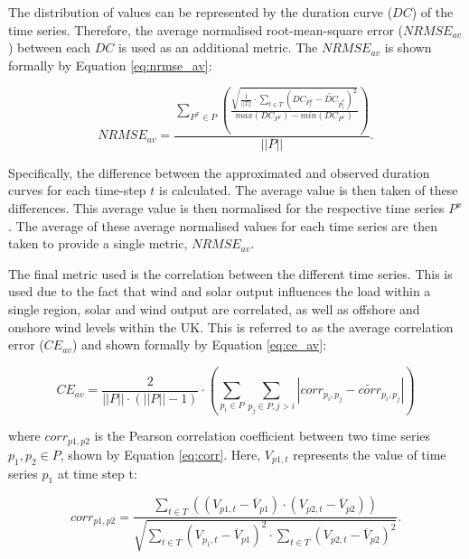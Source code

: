 The distribution of values can be represented by the duration curve ($DC$) of the time series. Therefore, the average normalised root-mean-square error ($NRMSE_{av}$) between each $DC$ is used as an additional metric. The $NRMSE_{av}$ is shown formally by Equation \ref{eq:nrmse_av}:

\begin{equation}
\label{eq:nrmse_av}
NRMSE_{av}=\frac
{\sum\limits_{P^x{\in} P}\left(\frac
	{\sqrt{
			\frac{1}{\left|\left|T\right|\right|}
			\cdot
			\sum\limits_{t\in T}(DC_{P^x_t}-\widetilde{DC}_{\widetilde{P}^x_t})^2}
	}
	{max(DC_{P^x})-min(DC_{P^x})}
	\right)}
{\left|\left|P\right|\right|}.
\end{equation}

Specifically, the difference between the approximated and observed duration curves for each time-step $t$ is calculated. The average value is then taken of these differences. This average value is then normalised for the respective time series $P^x$. The average of these average normalised values for each time series are then taken to provide a single metric, $NRMSE_{av}$.



The final metric used is the correlation between the different time series. This is used due to the fact that wind and solar output influences the load within a single region, solar and wind output are correlated, as well as offshore and onshore wind levels within the UK. This is referred to as the average correlation error ($CE_{av}$) and shown formally by Equation \ref{eq:ce_av}:


\begin{equation}
\label{eq:ce_av}
CE_{av}=\frac{2}{\left|\left|P\right|\right|\cdot(\left|\left|P\right|\right|-1)}\cdot
\left(
\sum\limits_{p_i\in P}\sum\limits_{p_j\in P,j>i}
\left|
corr_{p_i,p_j}-\widetilde{corr}_{p_i,p_j}
\right|
\right)
\end{equation}

\noindent where $corr_{p1,p2}$ is the Pearson correlation coefficient between two time series $p_1,p_2\in P$, shown by Equation \ref{eq:corr}. Here, $V_{p1,t}$ represents the value of time series $p_1$ at time step t:

\begin{equation}
\label{eq:corr}
corr_{p1,p2}=\frac
{\sum\limits_{t\in T}\left(\left(V_{p1,t}-\overline{V}_{p1}\right)\cdot\left(V_{p2,t}-\overline{V}_{p2}\right)\right)}
{\sqrt{
		\sum\limits_{t\in T} \left(V_{p_1,t}-\overline{V}_{p1}\right)^2\cdot\sum\limits_{t\in T}\left(V_{p2,t}-\overline{V}_{p2}\right)^2
}}.
\end{equation}


